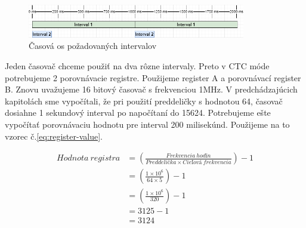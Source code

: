\begin{figure}[!h]
    \centering
    \includegraphics[width=0.85\textwidth]{img/interval-timeline.drawio.png}
    \caption{Časová os požadovaných intervalov}
    \label{figure:interval-timeline}
\end{figure}

Jeden časovač chceme použiť na dva rôzne intervaly. Preto v CTC móde potrebujeme 2 porovnávacie registre. Použijeme register A a porovnávací register B. Znovu uvažujeme
16 bitový časovač s frekvenciou 1MHz. V predchádzajúcich kapitolách sme vypočítali, že pri použití preddeličky s hodnotou 64, časovač dosiahne 1 sekundový interval
po napočítaní do 15624. Potrebujeme ešte vypočítať porovnávaciu hodnotu pre interval 200 milisekúnd. Použijeme na to vzorec č.\ref{eq:register-value}.

\begin{equation}
    \begin{aligned}
        Hodnota\:registra & = (\frac{Frekvencia\:hodín}{Preddelička \times Cieľová\:frekvencia}) - 1 \\
                          & = (\frac{1 \times 10^{6}}{64 \times 5}) - 1                              \\
                          & = (\frac{1 \times 10^{6}}{320}) - 1                                      \\
                          & = 3125 - 1                                                               \\
                          & = 3124                                                                   \\
    \end{aligned}
\end{equation}

